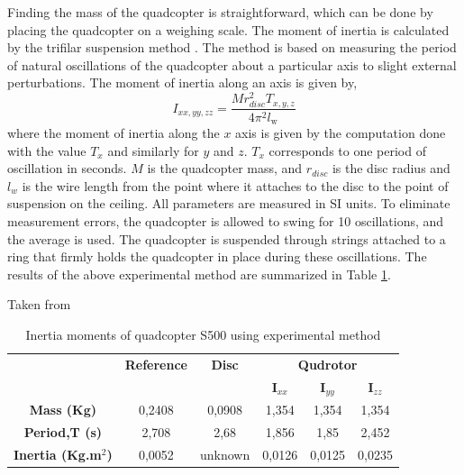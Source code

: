 \documentclass[letterpaper%
, twoside%
, 12pt%
,memoire%
, english%
,creativecommons,hyperref%
]{thETS}
\theoremstyle{newThmStyle}
\begin{document}
Finding the mass of the quadcopter is straightforward, which can be done by placing the quadcopter on a weighing scale. The moment of inertia is calculated by the trifilar suspension method \citep{harris2002harris}. The method is based on measuring the period of natural oscillations of the quadcopter about a particular axis to slight external perturbations. The moment of inertia along an axis is given by, 
\begin{equation}\label{ixyz}
I_{xx,yy,zz}=\frac{Mr^2_{disc}T_{x,y,z}}{4\pi^2l_\textrm{w}}
\end{equation}
where the moment of inertia along the $x$ axis is given by the computation done with the value $T_x$ and similarly for $y$ and $z$. $T_x$ corresponds to one period of oscillation in seconds. $M$ is the quadcopter mass, and $r_{disc}$ is the disc radius and $l_w$ is the wire length from the point where it attaches to the disc to the point of suspension on the ceiling. All parameters are measured in SI units. To eliminate measurement errors, the quadcopter is allowed to swing for 10 oscillations, and the average is used. The quadcopter is suspended through strings attached to a ring that firmly holds the quadcopter in place during these oscillations. The results of the above experimental method are summarized in Table \ref{tim}. 
\begin{table}
	\parbox{0.65\textwidth}{
		\begin{center}
		\caption{Inertia moments of quadcopter S500 using experimental method\label{tim}}Taken from \citep{RN121}
		\end{center}	
	}
	\begin{tabular}{|c|c|c|c|c|c|}
		\hline
		{\bf } & {\bf Reference} & {\bf Disc} & \multicolumn{3}{|c|}{\bf Qudrotor} \\
		\cline{4-6}
		& & & \bf I$_{xx}$ & \bf I$_{yy}$ & \bf I$_{zz}$\\
		\hline
		\bf Mass (Kg) & 0,2408 & 0,0908 & 1,354 & 1,354 & 1,354\\
		\hline
		\bf Period,T (s)& 2,708 & 2,68 & 1,856 & 1,85 & 2,452\\
	    \hline
		\bf Inertia (Kg.m$^2$)& 0,0052 & unknown & 0,0126 & 0,0125 & 0,0235 \\
		\hline
	\end{tabular}
\end{table}
\end{document}
